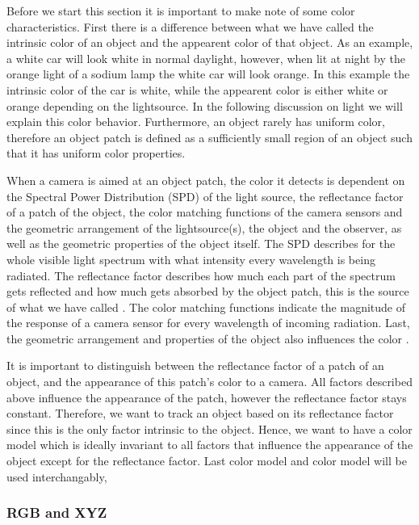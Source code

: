 \documentclass[a4paper,11pt]{article}
\begin{document}
Before we start this section it is important to make note of some color characteristics. First there is a difference between what we have called the intrinsic color of an object and the appearent color of that object. As an example, a white car will look white in normal daylight, however, when lit at night by the orange light of a sodium lamp the white car will look orange. In this example the intrinsic color of the car is white, while the appearent color is either white or orange depending on the lightsource. In the following discussion on light we will explain this color behavior. Furthermore, an object rarely has uniform color, therefore an object patch is defined as a sufficiently small region of an object such that it has uniform color properties.

When a camera is aimed at an object patch, the color it detects is dependent on the Spectral Power Distribution (SPD) of the light source, the reflectance factor of a patch of the object, the color matching functions of the camera sensors and the geometric arrangement of the lightsource(s), the object and the observer, as well as the geometric properties of the object itself. The SPD describes for the whole visible light spectrum with what intensity every wavelength is being radiated. The reflectance factor describes how much each part of the spectrum gets reflected and how much gets absorbed by the object patch, this is the source of what we have called . The color matching functions indicate the magnitude of the response of a camera sensor for every wavelength of incoming radiation. Last, the geometric arrangement and properties of the object also influences the color \cite{gevers_color}.

It is important to distinguish between the reflectance factor of a patch of an object, and the appearance of this patch's color to a camera. All factors described above influence the appearance of the patch, however the reflectance factor stays constant. Therefore, we want to track an object based on its reflectance factor since this is the only factor intrinsic to the object.  Hence, we want to have a color model which is ideally invariant to all factors that influence the appearance of the object except for the reflectance factor.  Last color model and color model will be used interchangably, 

\subsubsection{RGB and XYZ}
		
\end{document}
